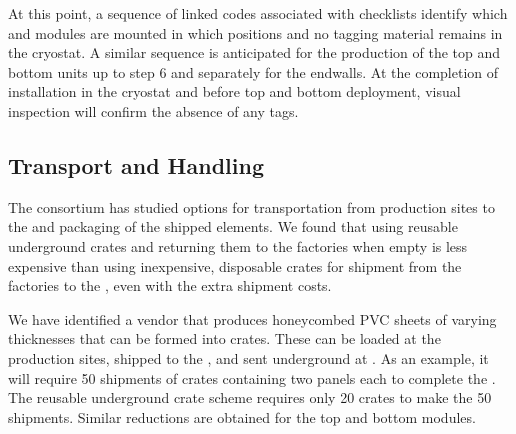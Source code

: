 At this point, %
a sequence of linked codes associated with  checklists %
identify which  and  modules %
are mounted in %
which  positions and no tagging material remains in the cryostat.  A similar sequence is anticipated for the production of the  top and bottom units up to step 6 and separately for the endwalls.  
At the completion of installation in the cryostat and before  top and bottom deployment, visual inspection will confirm the absence of any tags.

\subsection{Transport and Handling}
\label{sec:fdsp-hv-transport-transport}

The  consortium has studied %
options for %
transportation from  production sites %
to the  %
and packaging of the shipped elements. %
We found that using reusable underground 
crates and returning them to the factories when empty is less expensive than using inexpensive, disposable crates for shipment from the factories to the ,  
even with the extra shipment costs. %

We have identified a vendor that %
produces honeycombed PVC sheets of varying thicknesses that can be formed into crates. These %
can be loaded at the production sites, %
shipped to the , and sent underground at \surf.  
As an example, %
it will require 50 shipments of crates containing two  panels each to complete the .  %
The reusable underground crate scheme requires only 20 crates to make the 50 shipments. Similar reductions are obtained for the top and bottom  modules. 

